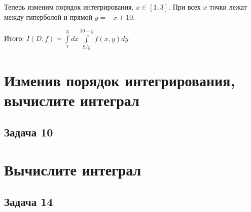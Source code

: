 \documentclass[a4paper, fleqn]{article}
\begin{document}
    Теперь изменим порядок интегрирования. $x \in [1, 3].$ При всех $x$ точки лежат между гиперболой и прямой $y = -x + 10.$
    
    Итого: $I(D, f) = \int\limits_{1}^{3} dx \int\limits_{9/y}^{10 - y} f(x, y) dy$
    
    
    \section*{Изменив порядок интегрирования, вычислите интеграл}
    
    \subsection*{Задача 10}
    
    
    
    \section*{Вычислите интеграл}
    
    \subsection*{Задача 14}
    
    
    
\end{document}
